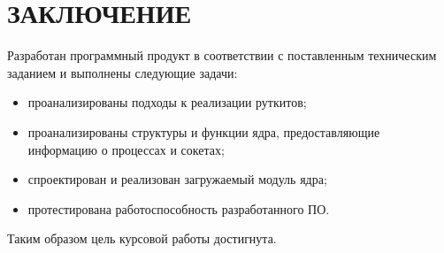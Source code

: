 \chapter*{\hfill{}ЗАКЛЮЧЕНИЕ\hfill{}}%
\label{cha:zakliuchenie}

Разработан программный продукт в соответствии с поставленным техническим заданием и выполнены следующие задачи:
\begin{itemize}
    \item проанализированы подходы к реализации руткитов;
    \item проанализированы структуры и функции ядра, предоставляющие информацию о процессах и сокетах; 
    \item спроектирован и реализован загружаемый модуль ядра;
    \item протестирована работоспособность разработанного ПО.
\end{itemize}

Таким образом цель курсовой работы достигнута.